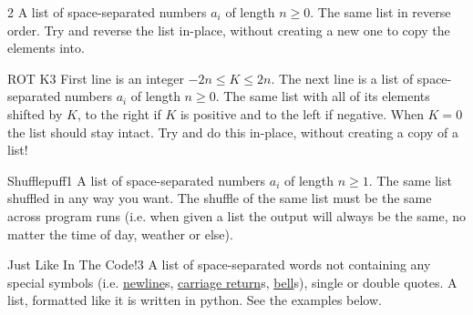 \begin{task}{}{2}
    \In
    A list of space-separated numbers $a_i$ of length $n \geq 0$.
    \Out
    The same list in reverse order.
    \Note 
    Try and reverse the list in-place, without creating a new one to copy the elements into.
    
    \begin{ExampleIO}
    \end{ExampleIO}
\end{task}

\begin{task}{ROT K}{3}
    \In
    First line is an integer $-2n \leq K \leq 2n$.
    The next line is a list of space-separated numbers $a_i$ of length $n \geq 0$.
    \Out
    The same list with all of its elements shifted by $K$, to the right if $K$ is 
    positive and to the left if negative. When $K = 0$ the list should stay intact.
    \Note 
    Try and do this in-place, without creating a copy of a list!
    
    \begin{ExampleIO}
    \end{ExampleIO}
\end{task}

\begin{task}{Shufflepuff}{1}
    \In
    A list of space-separated numbers $a_i$ of length $n \geq 1$.
    \Out
    The same list shuffled in any way you want. The shuffle of the same list must be the
    same across program runs (i.e. when given a list the output
    will always be the same, no matter the time of day, weather or else).
    
    \begin{ExampleIO}
    \end{ExampleIO}
\end{task}

\begin{task}{Just Like In The Code!}{3}
    \In
    A list of space-separated words not containing any special symbols 
    (i.e. \href{https://en.wikipedia.org/wiki/Newline}{newline}s, 
    \href{https://en.wikipedia.org/wiki/Carriage_return}{carriage return}s, 
    \href{https://en.wikipedia.org/wiki/Bell_character}{bell}s), single or
    double quotes.
    \Out
    A list, formatted like it is written in python. See the examples below.
    
    \begin{ExampleIO}
    \end{ExampleIO}
\end{task}

